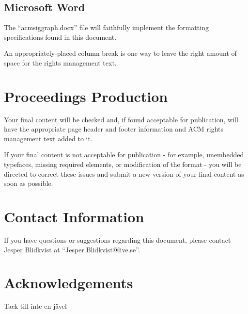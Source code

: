 \documentclass[tog]{acmsiggraph}
\begin{document}
\subsection{Microsoft Word}

The ``acmsiggraph.docx'' file will faithfully implement the formatting
specifications found in this document.

An appropriately-placed column break is one way to leave the right
amount of space for the rights management text.

\section{Proceedings Production}

Your final content will be checked and, if found acceptable for publication, will have the appropriate page header and footer information and ACM rights management text added to it. 

If your final content is not acceptable for publication - for example, unembedded typefaces, missing required elements, or modification of the format - you will be directed to correct these issues and submit a new version of your final content as soon as possible.

\section{Contact Information}

If you have questions or suggestions regarding this document, please
contact Jesper Blidkvist at ``Jesper.Blidkvist@live.se''.

\section*{Acknowledgements}

Tack till inte en jävel


\nocite{*}

\end{document}
